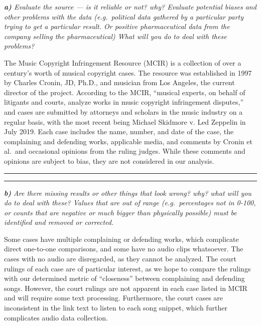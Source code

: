\documentclass[11pt]{article}
\begin{document}
    \emph{\textbf{a)} Evaluate the source --- is it reliable or not? why?
Evaluate potential biases and other problems with the data
(e.g.~political data gathered by a particular party trying to get a
particular result. Or positive pharmaceutical data from the company
selling the pharmaceutical) What will you do to deal with these
problems?}

The Music Copyright Infringement Resource (MCIR) is a collection of over
a century's worth of musical copyright cases. The resource was
established in 1997 by Charles Cronin, JD, Ph.D., and musician from Los
Angeles, the current director of the project. According to the MCIR,
``musical experts, on behalf of litigants and courts, analyze works in
music copyright infringement disputes,'' and cases are submitted by
attorneys and scholars in the music industry on a regular basis, with
the most recent being Michael Skidmore v. Led Zeppelin in July 2019.
Each case includes the name, number, and date of the case, the
complaining and defending works, applicable media, and comments by
Cronin et al.~and occasional opinions from the ruling judges. While
these comments and opinions are subject to bias, they are not considered
in our analysis.

\begin{center}\rule{0.5\linewidth}{\linethickness}\end{center}

\begin{center}\rule{0.5\linewidth}{\linethickness}\end{center}

    \emph{\textbf{b)} Are there missing results or other things that look
wrong? why? what will you do to deal with these? Values that are out of
range (e.g.~percentages not in 0-100, or counts that are negative or
much bigger than physically possible) must be identified and removed or
corrected.}

Some cases have multiple complaining or defending works, which
complicate direct one-to-one comparisons, and some have no audio clips
whatsoever. The cases with no audio are disregarded, as they cannot be
analyzed. The court rulings of each case are of particular interest, as
we hope to compare the rulings with our determined metric of
``closeness'' between complaining and defending songs. However, the
court rulings are not apparent in each case listed in MCIR and will
require some text processing. Furthermore, the court cases are
inconsistent in the link text to listen to each song snippet, which
further complicates audio data collection.
\end{document}
